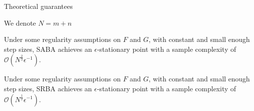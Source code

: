 \documentclass{beamer}
\begin{document}
\begin{frame}{Theoretical guarantees }

    We denote $N = m + n$

    \begin{theorem}
        Under some regularity assumptions on $F$ and $G$, with constant and small enough step sizes, SABA achieves an $\epsilon$-stationary point with a sample complexity of $\mathcal O(N^{\frac23}\epsilon^{-1})$.
    \end{theorem}

    \begin{theorem}
        Under some regularity assumptions on $F$ and $G$, with constant and small enough step sizes, SRBA achieves an $\epsilon$-stationary point with a sample complexity of $\mathcal O(N^{\frac12}\epsilon^{-1})$.
    \end{theorem}


\end{frame}





\end{document}
